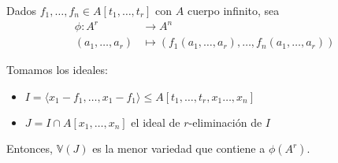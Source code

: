 \begin{teorema}
  Dados $f_1,\dots, f_n \in A[t_1, \dots, t_r]$ con $A$ cuerpo infinito, sea
  \begin{equation*}
    \begin{align*}
      \phi \colon A^r  & \to A^n                                                              \\
      (a_1,\dots, a_r) & \mapsto \left(f_1(a_1,\dots, a_r), \dots, f_n(a_1,\dots, a_r)\right)
    \end{align*}
  \end{equation*}

  Tomamos los ideales:
  \begin{itemize}
    \item $I = \langle x_1-f_1,\dots,  x_1-f_1\rangle \le A[t_1,\dots, t_r,x_1\dots, x_n]$
    \item $J = I\cap A[x_1,\dots, x_n]$ el ideal de $r$-eliminación de $I$
  \end{itemize}

  Entonces, $\mathbb{V}(J)$ es la menor variedad que contiene a $\phi(A^r)$.
\end{teorema}
